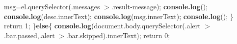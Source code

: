 {\begin{DoxyParamCaption}
                                                                                                                                                                                                                                         msg=el.\+query\+Selector(\textquotesingle{}.messages $>$.result-\/message\textquotesingle{});                                                                                                                                                                                                                                                                                                                   {\bf console.\+log}(\textquotesingle{}\textquotesingle{});                                                                                                                                                                                                                                                                                                                   {\bf console.\+log}(desc.\+inner\+Text);                                                                                                                                                                                                                                                                                                                   {\bf console.\+log}(msg.\+inner\+Text);                                                                                                                                                                                                                                                                                                                   {\bf console.\+log}(\textquotesingle{}\textquotesingle{});                                                                                                                                                                                                                                                   \}                                                                                                                                                                                                                                                   return 1;                                                                                                                                                                                                                   \}{\bf else}\{                                                                                                                                                                                                                                                   {\bf console.\+log}(document.\+body.\+query\+Selector(\textquotesingle{}.alert $>$.bar.\+passed,.alert $>$.bar.\+skipped\textquotesingle{}).inner\+Text);                                                                                                                                                                                                                                                   return 0;                                                                                                                                                                                               
\end{DoxyParamCaption}}
